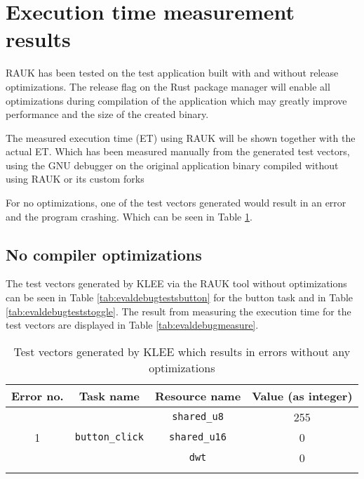 

\section{Execution time measurement results}
RAUK has been tested on the test application built with and without release
optimizations. The release flag on the Rust package manager will enable all
optimizations during compilation of the application which may greatly improve
performance and the size of the created binary.

The measured execution time (ET) using RAUK will be shown together with the
actual ET. Which has been measured manually from the generated test vectors,
using the GNU debugger on the original application binary compiled without
using RAUK or its custom forks

For no optimizations, one of the test vectors generated would result in an
error and the program crashing. Which can be seen in Table \ref{tab:evaldebugtestsbuttonerror}.

\subsection{No compiler optimizations}
The test vectors generated by KLEE via the RAUK tool without optimizations can
be seen in Table \ref{tab:evaldebugtestsbutton} for the button task and in
Table \ref{tab:evaldebugteststoggle}. The result from measuring the execution
time for the test vectors are displayed in Table \ref{tab:evaldebugmeasure}.


\begin{longtable}{|c|c|c|c|}
\hline
Error no. & Task name & Resource name & Value (as integer) \\ \hline
\multirow{3}{*}{1} & \multirow{3}{*}{\texttt{button\_click}} & \texttt{shared\_u8}  & 255 \\ \cline{3-4}
                   &                                         & \texttt{shared\_u16} & 0 \\ \cline{3-4}
                   &                                         & \texttt{dwt}         & 0 \\ \hline
\caption{Test vectors generated by KLEE which results in errors without any optimizations}
\label{tab:evaldebugtestsbuttonerror}
\end{longtable}

